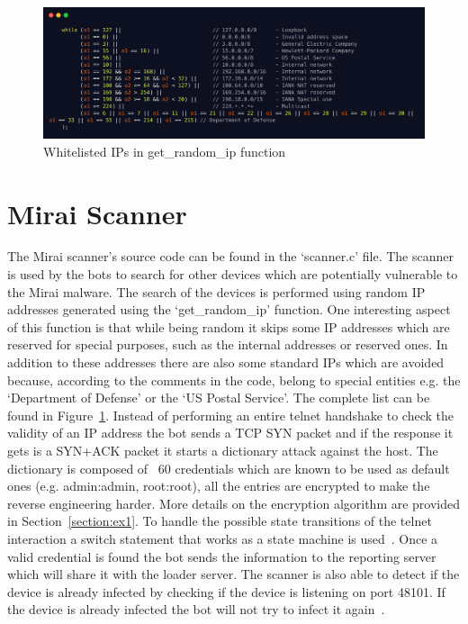 \begin{figure}
    \centering
    \includegraphics[scale=0.12]{resources/images/get_random_ip.png}
    \caption{Whitelisted IPs in get\_random\_ip function}
    \label{fig:random_ip}
\end{figure}
\section{Mirai Scanner}
The Mirai scanner's source code can be found in the `scanner.c' file. The scanner is used by the bots to search for other devices which are potentially vulnerable to the Mirai malware. The search of the devices is performed using random IP addresses generated using the `get\_random\_ip' function. One interesting aspect of this function is that while being random it skips some IP addresses which are reserved for special purposes, such as the internal addresses or reserved ones. In addition to these addresses there are also some standard IPs which are avoided because, according to the comments in the code, belong to special entities e.g. the `Department of Defense' or the `US Postal Service'. The complete list can be found in Figure~\ref{fig:random_ip}. Instead of performing an entire telnet handshake to check the validity of an IP address the bot sends a TCP SYN packet and if the response it gets is a SYN+ACK packet it starts a dictionary attack against the host. The dictionary is composed of ~60 credentials which are known to be used as default ones (e.g. admin:admin, root:root), all the entries are encrypted to make the reverse engineering harder. More details on the encryption algorithm are provided in Section~\ref{section:ex1}. To handle the possible state transitions of the telnet interaction a switch statement that works as a state machine is used~\cite{de2018ddos}. Once a valid credential is found the bot sends the information to the reporting server which will share it with the loader server. The scanner is also able to detect if the device is already infected by checking if the device is listening on port 48101. If the device is already infected the bot will not try to infect it again~\cite{mirai-hackforum}.
